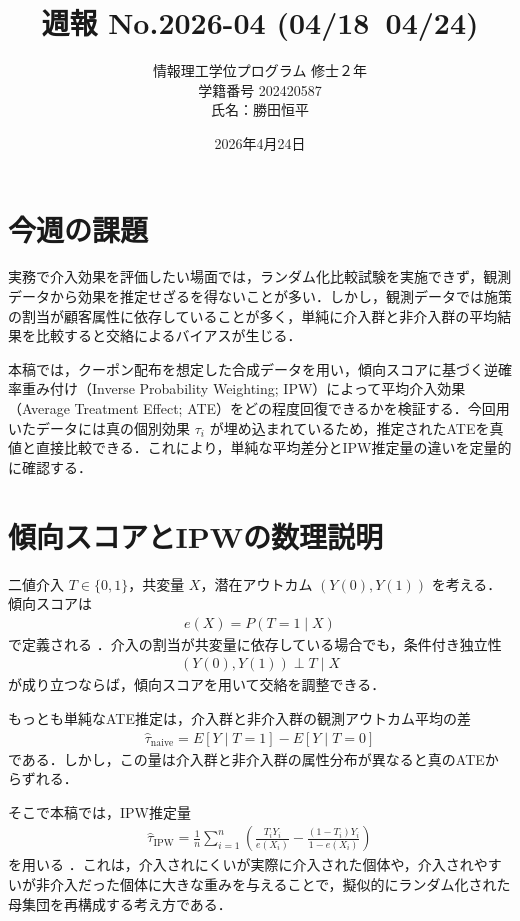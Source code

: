 \documentclass{article}
\title{\vspace{-3cm}週報 No.2026-04 (04/18~04/24)}
\author{情報理工学位プログラム 修士２年\\ 学籍番号 202420587 \\氏名：勝田恒平}
\date{2026年4月24日}
\begin{document}
\maketitle

\section{今週の課題}
実務で介入効果を評価したい場面では，ランダム化比較試験を実施できず，観測データから効果を推定せざるを得ないことが多い．しかし，観測データでは施策の割当が顧客属性に依存していることが多く，単純に介入群と非介入群の平均結果を比較すると交絡によるバイアスが生じる．

本稿では，クーポン配布を想定した合成データを用い，傾向スコアに基づく逆確率重み付け（Inverse Probability Weighting; IPW）によって平均介入効果（Average Treatment Effect; ATE）をどの程度回復できるかを検証する．今回用いたデータには真の個別効果 $\tau_i$ が埋め込まれているため，推定されたATEを真値と直接比較できる．これにより，単純な平均差分とIPW推定量の違いを定量的に確認する．

\section{傾向スコアとIPWの数理説明}
二値介入 $T \in \{0,1\}$，共変量 $X$，潜在アウトカム $(Y(0), Y(1))$ を考える．傾向スコアは
\begin{align}
e(X) = P(T=1 \mid X)
\end{align}
で定義される \cite{rosenbaum1983central}．介入の割当が共変量に依存している場合でも，条件付き独立性
\begin{align}
(Y(0), Y(1)) \perp T \mid X
\end{align}
が成り立つならば，傾向スコアを用いて交絡を調整できる．

もっとも単純なATE推定は，介入群と非介入群の観測アウトカム平均の差
\begin{align}
\hat{\tau}_{\mathrm{naive}}
= E[Y \mid T=1] - E[Y \mid T=0]
\end{align}
である．しかし，この量は介入群と非介入群の属性分布が異なると真のATEからずれる．

そこで本稿では，IPW推定量
\begin{align}
\hat{\tau}_{\mathrm{IPW}}
= \frac{1}{n}\sum_{i=1}^{n}
\left(
\frac{T_i Y_i}{e(X_i)}
- \frac{(1-T_i)Y_i}{1-e(X_i)}
\right)
\end{align}
を用いる \cite{horvitz1952generalization}．これは，介入されにくいが実際に介入された個体や，介入されやすいが非介入だった個体に大きな重みを与えることで，擬似的にランダム化された母集団を再構成する考え方である．
\end{document}
